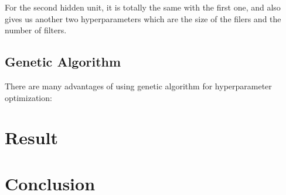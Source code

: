 \documentclass[12pt]{article}
\begin{document}
For the second hidden unit, it is totally the same with the first one, and also gives us another two hyperparameters which are the size of the filers and the number of filters.
  

\subsection{Genetic Algorithm}
There are many advantages of using genetic algorithm for hyperparameter optimization:
\section{Result}

\section{Conclusion}
\end{document}
